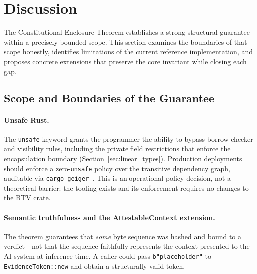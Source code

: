 
\section{Discussion}
\label{sec:discussion}

The Constitutional Enclosure Theorem establishes a strong structural
guarantee within a precisely bounded scope.
This section examines the boundaries of that scope honestly,
identifies limitations of the current reference implementation,
and proposes concrete extensions that preserve the core invariant
while closing each gap.

\subsection{Scope and Boundaries of the Guarantee}
\label{sec:scope}

\paragraph{Unsafe Rust.}
The \texttt{unsafe} keyword grants the programmer the ability to
bypass borrow-checker and visibility rules, including the private
field restrictions that enforce the encapsulation boundary
(Section~\ref{sec:linear_types}).
Production deployments should enforce a zero-\texttt{unsafe} policy
over the transitive dependency graph, auditable via
\texttt{cargo geiger}~\cite{cargogeiger}.
This is an operational policy decision, not a theoretical barrier:
the tooling exists and its enforcement requires no changes to the
BTV crate.

\paragraph{Semantic truthfulness and the AttestableContext extension.}
The theorem guarantees that \emph{some} byte sequence was hashed
and bound to a verdict---not that the sequence faithfully represents
the context presented to the AI system at inference time.
A caller could pass \texttt{b"placeholder"} to
\texttt{EvidenceToken::new} and obtain a structurally valid token.

